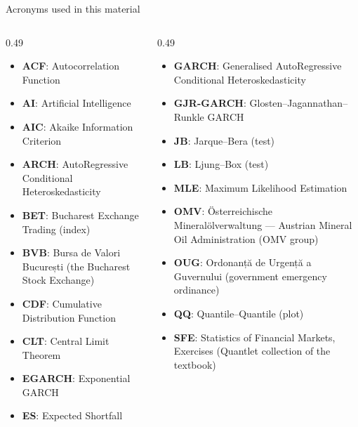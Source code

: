 \begin{frame}{Acronyms used in this material}
\begin{columns}[T]
\begin{column}{0.49\textwidth}
\begin{itemize}\setlength{\itemsep}{0pt}
    \item \textbf{ACF}: Autocorrelation Function
    \item \textbf{AI}: Artificial Intelligence
    \item \textbf{AIC}: Akaike Information Criterion
    \item \textbf{ARCH}: AutoRegressive Conditional Heteroskedasticity
    \item \textbf{BET}: Bucharest Exchange Trading (index)
    \item \textbf{BVB}: Bursa de Valori București (the Bucharest Stock Exchange)
    \item \textbf{CDF}: Cumulative Distribution Function
    \item \textbf{CLT}: Central Limit Theorem
    \item \textbf{EGARCH}: Exponential GARCH
    \item \textbf{ES}: Expected Shortfall
\end{itemize}
\end{column}
\begin{column}{0.49\textwidth}
\begin{itemize}\setlength{\itemsep}{0pt}
    \item \textbf{GARCH}: Generalised AutoRegressive Conditional Heteroskedasticity
    \item \textbf{GJR-GARCH}: Glosten–Jagannathan–Runkle GARCH
    \item \textbf{JB}: Jarque–Bera (test)
    \item \textbf{LB}: Ljung–Box (test)
    \item \textbf{MLE}: Maximum Likelihood Estimation
    \item \textbf{OMV}: Österreichische Mineralölverwaltung — Austrian Mineral Oil Administration (OMV group)
    \item \textbf{OUG}: Ordonanță de Urgență a Guvernului (government emergency ordinance)
    \item \textbf{QQ}: Quantile–Quantile (plot)
    \item \textbf{SFE}: Statistics of Financial Markets, Exercises (Quantlet collection of the textbook)
\end{itemize}
\end{column}
\end{columns}
\end{frame}

